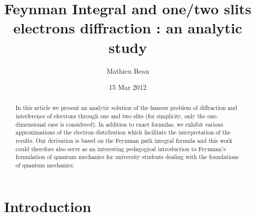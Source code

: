 \documentclass[12pt,aps,prb,preprint]{revtex4-1}   %
\begin{document}
\title{Feynman Integral and one/two slits electrons diffraction : an analytic study}
\author{Mathieu Beau}
\date{15 Mar 2012}

\begin{abstract}

In this article we present an analytic solution of the famous
problem of diffraction and interference of electrons through one
and two slits (for simplicity, only the one-dimensional case is
considered). 
In addition to exact formulas, 
we exhibit various approximations of the electron
distribution which facilitate the interpretation of the results.
Our derivation is based on the Feynman path integral formula and
this work could therefore also serve as an interesting pedagogical
introduction to Feynman's  formulation of quantum mechanics for
university students dealing with the foundations of quantum
mechanics.
\end{abstract}


\maketitle

\section{Introduction}
\end{document}
